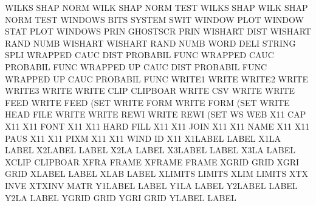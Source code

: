 WILKS    SHAP NORM                      WILK     SHAP NORM TEST
WILKS    SHAP                           WILK     SHAP NORM TEST
WINDOWS  BITS                           SYSTEM   SWIT
WINDOW   PLOT                           WINDOW   STAT PLOT
WINDOWS  PRIN                           GHOSTSCR PRIN
WISHART  DIST                           WISHART  RAND NUMB
WISHART                                 WISHART  RAND NUMB
WORD     DELI                           STRING   SPLI
WRAPPED  CAUC DIST                      PROBABIL FUNC
WRAPPED  CAUC                           PROBABIL FUNC
WRAPPED  UP   CAUC DIST                 PROBABIL FUNC
WRAPPED  UP   CAUC                      PROBABIL FUNC
WRITE1                                  WRITE
WRITE2                                  WRITE
WRITE3                                  WRITE
WRITE    CLIP                           CLIPBOAR
WRITE    CSV                            WRITE
WRITE    FEED                           WRITE    FEED (SET
WRITE    FORM                           WRITE    FORM (SET
WRITE    HEAD FILE                      WRITE
WRITE    REWI                           WRITE    REWI (SET
WS                                      WEB
X11      CAP                            X11
X11      FONT                           X11
X11      HARD FILL                      X11
X11      JOIN                           X11
X11      NAME                           X11
X11      PAUS                           X11
X11      PIXM                           X11
X11      WIND ID                        X11
X1LABEL                                 LABEL
X1LA                                    LABEL
X2LABEL                                 LABEL
X2LA                                    LABEL
X3LABEL                                 LABEL
X3LA                                    LABEL
XCLIP                                   CLIPBOAR
XFRA                                    FRAME
XFRAME                                  FRAME
XGRID                                   GRID
XGRI                                    GRID
XLABEL                                  LABEL
XLAB                                    LABEL
XLIMITS                                 LIMITS
XLIM                                    LIMITS
XTX      INVE                           XTXINV   MATR
Y1LABEL                                 LABEL
Y1LA                                    LABEL
Y2LABEL                                 LABEL
Y2LA                                    LABEL
YGRID                                   GRID
YGRI                                    GRID
YLABEL                                  LABEL
